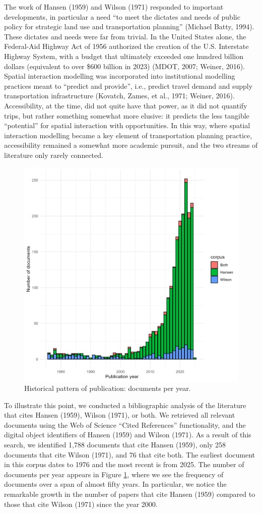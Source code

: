 \documentclass[
11pt, %
oneside, %
english, %
singlespacing, %
]{macthesis} %
\begin{document}
The work of Hansen (1959) and Wilson (1971) responded to important developments, in particular a need ``to meet the dictates and needs of public policy for strategic land use and transportation planning'' (Michael Batty, 1994). These dictates and needs were far from trivial. In the United States alone, the Federal-Aid Highway Act of 1956 authorized the creation of the U.S. Interstate Highway System, with a budget that ultimately exceeded one hundred billion dollars (equivalent to over \$600 billion in 2023) (MDOT, 2007; Weiner, 2016). Spatial interaction modelling was incorporated into institutional modelling practices meant to ``predict and provide'', i.e., predict travel demand and supply transportation infrastructure (Kovatch, Zames, et al., 1971; Weiner, 2016). Accessibility, at the time, did not quite have that power, as it did not quantify trips, but rather something somewhat more elusive: it predicts the less tangible ``potential'' for spatial interaction with opportunities. In this way, where spatial interaction modelling became a key element of transportation planning practice, accessibility remained a somewhat more academic pursuit, and the two streams of literature only rarely connected.

\begin{figure}
\includegraphics[width=0.7\linewidth]{data/figures/chp1-docs_per_year_plot} \caption{Historical pattern of publication: documents per year.}\label{fig:chp1-fig-docs-per-year}
\end{figure}

To illustrate this point, we conducted a bibliographic analysis of the literature that cites Hansen (1959), Wilson (1971), or both. We retrieved all relevant documents using the Web of Science ``Cited References'' functionality, and the digital object identifiers of Hansen (1959) and Wilson (1971). As a result of this search, we identified 1,788 documents that cite Hansen (1959), only 258 documents that cite Wilson (1971), and 76 that cite both. The earliest document in this corpus dates to 1976 and the most recent is from 2025. The number of documents per year appears in Figure \ref{fig:chp1-fig-docs-per-year}, where we see the frequency of documents over a span of almost fifty years. In particular, we notice the remarkable growth in the number of papers that cite Hansen (1959) compared to those that cite Wilson (1971) since the year 2000.
\end{document}
